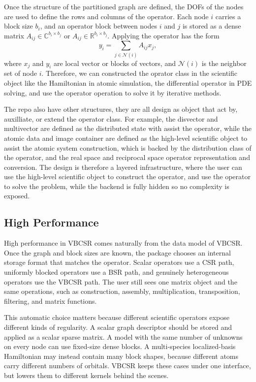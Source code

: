 \documentclass[
reprint,
superscriptaddress,
frontmatterverbose,
amsmath,amssymb,
pra,
]{revtex4-2}
\begin{document}
Once the structure of the partitioned graph are defined, the DOFs of the nodes are used to define the rows and columns of the operator.  Each node $i$ carries a block size $b_i$, and an operator block between nodes $i$ and $j$ is stored as a dense matrix $A_{ij}\in \mathbb{C}^{b_i \times b_j}$ or $A_{ij}\in \mathbb{R}^{b_i \times b_j}$.  Applying the operator has the form
\begin{equation}
    y_i = \sum_{j \in \mathcal{N}(i)} A_{ij} x_j,
    \label{eq:block_apply}
\end{equation}
where $x_j$ and $y_i$ are local vector or blocks of vectors, and $\mathcal{N}(i)$ is the
neighbor set of node $i$. Therefore, we can constructed the oprator class in the scientific object like the Hamiltonian in atomic simulation, the differential operator in PDE solving, and use the operator operation to solve it by iterative methods. 

The repo also have other structures, they are all design as object that act by, auxilliate, or extend the operator class. For example, the disvector and multivector are defined as the distributed state with assist the operator, while the atomic data and image container are defined as the high-level scientific object to assist the atomic system construction, which is backed by the distribution class of the operator, and the real space and reciprocal space operator representation and conversion.  The design is therefore a layered infrastructure, where the user can use the high-level scientific object to construct the operator, and use the operator to solve the problem, while the backend is fully hidden so no complexity is exposed.

\subsection{High Performance}

High performance in VBCSR comes naturally from the data model of VBCSR.  Once the graph and block sizes are known, the package chooses an internal storage format that matches the operator.  Scalar operators use a CSR path, uniformly blocked operators use a BSR path, and genuinely heterogeneous operators use the VBCSR path.  The user still sees one matrix object and the same operations, such as construction, assembly, multiplication, transposition, filtering, and matrix functions.

This automatic choice matters because different scientific operators expose
different kinds of regularity.  A scalar graph descriptor should be stored and
applied as a scalar sparse matrix.  A model with the same number of unknowns on
every node can use fixed-size dense blocks.  A multi-species localized-basis
Hamiltonian may instead contain many block shapes, because different atoms
carry different numbers of orbitals.  VBCSR keeps these cases under one
interface, but lowers them to different kernels behind the scenes.
\end{document}
